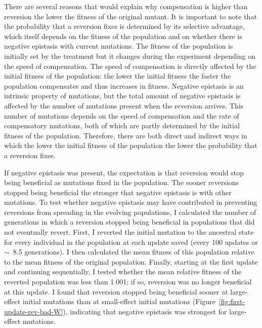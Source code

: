 \begin{doublespace}
There are several reasons that would explain why compensation
is higher than reversion the lower the fitness of the original mutant.
%
It is important to note that the probability
that a reversion fixes is determined by its selective advantage,
which itself depends on the fitness of the population
and on whether there is negative epistasis with current mutations.
%
The fitness of the population is initially set by the treatment
but it changes during the experiment depending on the speed of compensation.
%
The speed of compensation is directly affected by
the initial fitness of the population: the lower the initial fitness
the faster the population compensates and thus increases in fitness.
%
Negative epistasis is an intrinsic property of mutations,
but the total amount of negative epistasis is affected
by the number of mutations present when the reversion arrives.
%
This number of mutations depends on the speed of compensation
and the rate of compensatory mutations,
both of which are partly determined by the initial fitness of the population.
%
Therefore, there are both direct and indirect ways
in which the lower the initial fitness of the population
the lower the probability that a reversion fixes.



If negative epistasis was present,
the expectation is that reversion would stop being beneficial
as mutations fixed in the population.
%
The sooner reversions stopped being beneficial
the stronger that negative epistasis is with other mutations.
%
To test whether negative epistasis may have contributed in
preventing reversions from spreading in the evolving populations,
I calculated the number of generations in which a reversion
stopped being beneficial in populations that did not eventually revert.
%
First, I reverted the initial mutation to the ancestral state
for every individual in the population at each update saved
(every 100 updates or $\sim$~8.5 generations).
%
I then calculated the mean fitness of this population
relative to the mean fitness of the original population.
%
Finally, starting at the first update and continuing sequentially,
I tested whether the mean relative fitness of the reverted population
was less than 1.001; if so, reversion was no longer beneficial at this update.
%
I found that reversion stopped being beneficial sooner
at large-effect initial mutations than at small-effect initial mutations
(Figure~\ref{fig:first-update-rev-bad-W}),
indicating that negative epistasis was strongest for large-effect mutations.




\end{doublespace}
